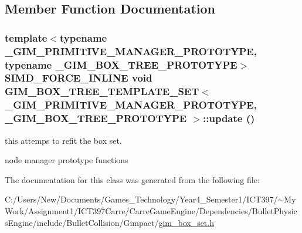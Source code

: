 \subsection{Member Function Documentation}
\hypertarget{class_g_i_m___b_o_x___t_r_e_e___t_e_m_p_l_a_t_e___s_e_t_0f5f2b683e561a4e05d912cb4973dac4}{
\subsubsection[update]{\setlength{\rightskip}{0pt plus 5cm}template$<$typename \_\-GIM\_\-PRIMITIVE\_\-MANAGER\_\-PROTOTYPE, typename \_\-GIM\_\-BOX\_\-TREE\_\-PROTOTYPE$>$ SIMD\_\-FORCE\_\-INLINE void {\bf GIM\_\-BOX\_\-TREE\_\-TEMPLATE\_\-SET}$<$ \_\-GIM\_\-PRIMITIVE\_\-MANAGER\_\-PROTOTYPE, \_\-GIM\_\-BOX\_\-TREE\_\-PROTOTYPE $>$::update ()}}
\label{class_g_i_m___b_o_x___t_r_e_e___t_e_m_p_l_a_t_e___s_e_t_0f5f2b683e561a4e05d912cb4973dac4}


this attemps to refit the box set. 

node manager prototype functions 

The documentation for this class was generated from the following file:\begin{CompactItemize}
\item 
C:/Users/New/Documents/Games\_\-Technology/Year4\_\-Semester1/ICT397/$\sim$My Work/Assignment1/ICT397Carre/CarreGameEngine/Dependencies/BulletPhysicsEngine/include/BulletCollision/Gimpact/\hyperlink{gim__box__set_8h}{gim\_\-box\_\-set.h}\end{CompactItemize}
